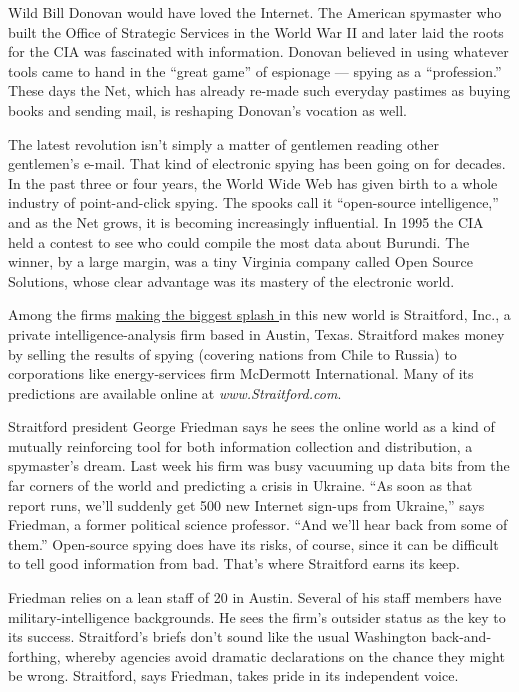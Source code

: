 \documentclass[UTF8,11pt]{ctexart}
\begin{document}
Wild Bill Donovan would have loved the Internet. The American spymaster who built the Office of Strategic Services in the World War II and later laid the roots for the CIA was fascinated with information. Donovan believed in using whatever tools came to hand in the “great game” of espionage — spying as a “profession.” These days the Net, which has already re-made such everyday pastimes as buying books and sending mail, is reshaping Donovan’s vocation as well.


The latest revolution isn’t simply a matter of gentlemen reading other gentlemen’s e-mail. That kind of electronic spying has been going on for decades. In the past three or four years, the World Wide Web has given birth to a whole industry of point-and-click spying. The spooks call it “open-source intelligence,” and as the Net grows, it is becoming increasingly influential. In 1995 the CIA held a contest to see who could compile the most data about Burundi. The winner, by a large margin, was a tiny Virginia company called Open Source Solutions, whose clear advantage was its mastery of the electronic world.


Among the firms \uline{making the biggest splash }in this new world is Straitford, Inc., a private intelligence-analysis firm based in Austin, Texas. Straitford makes money by selling the results of spying (covering nations from Chile to Russia) to corporations like energy-services firm McDermott International. Many of its predictions are available online at \textit{www.Straitford.com}.


Straitford president George Friedman says he sees the online world as a kind of mutually reinforcing tool for both information collection and distribution, a spymaster’s dream. Last week his firm was busy vacuuming up data bits from the far corners of the world and predicting a crisis in Ukraine. “As soon as that report runs, we’ll suddenly get 500 new Internet sign-ups from Ukraine,” says Friedman, a former political science professor. “And we’ll hear back from some of them.” Open-source spying does have its risks, of course, since it can be difficult to tell good information from bad. That’s where Straitford earns its keep.


Friedman relies on a lean staff of 20 in Austin. Several of his staff members have military-intelligence backgrounds. He sees the firm’s outsider status as the key to its success. Straitford’s briefs don’t sound like the usual Washington back-and-forthing, whereby agencies avoid dramatic declarations on the chance they might be wrong. Straitford, says Friedman, takes pride in its independent voice.
\end{document}
